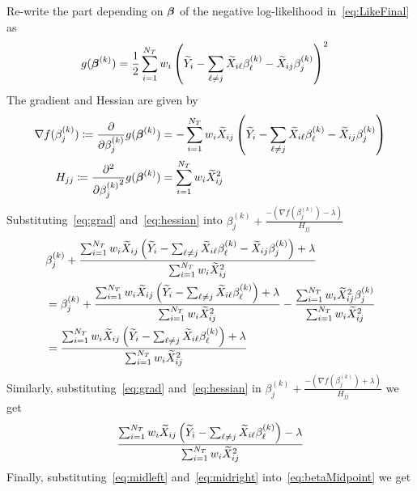 Re-write the part depending on $\boldsymbol{\beta}$ of the negative log-likelihood in~\eqref{eq:LikeFinal} as
\begin{align}
g(\boldsymbol{\beta}^{(k)}) & = \frac{1}{2} \sum_{i=1}^{N_T} w_i\left(  \widetilde{Y}_i - \sum_{\ell \neq j}\widetilde{X}_{i\ell} \beta_\ell^{(k)} - \widetilde{X}_{ij}\beta_j^{(k)} \right) ^2
\end{align}
The gradient and Hessian are given by
\begin{align}
\nabla f(\beta_j^{(k)}) \coloneqq \frac{\partial}{\partial \beta_j^{(k)}}g(\boldsymbol{\beta}^{(k)}) & = - \sum_{i=1}^{N_T} w_i \widetilde{X}_{ij}\left(  \widetilde{Y}_i - \sum_{\ell \neq j}\widetilde{X}_{i\ell} \beta_\ell^{(k)} - \widetilde{X}_{ij}\beta_j^{(k)} \right)  \label{eq:grad}\\
H_{jj} \coloneqq \frac{\partial^2}{\partial {\beta_j^{(k)}}^2}g(\boldsymbol{\beta}^{(k)}) & = \sum_{i=1}^{N_T} w_i \widetilde{X}_{ij}^2  \label{eq:hessian}
\end{align}
Substituting~\eqref{eq:grad} and~\eqref{eq:hessian} into $\beta_j^{(k)}+ \frac{-(\nabla f(\beta_j^{(k)}) - \lambda)}{H_{jj}}$ %
\begin{align}
& \beta_j^{(k)}+ \frac{  \sum_{i=1}^{N_T} w_i \widetilde{X}_{ij}\left(  \widetilde{Y}_i - \sum_{\ell \neq j}\widetilde{X}_{i\ell} \beta_\ell^{(k)} - \widetilde{X}_{ij}\beta_j^{(k)} \right)  + \lambda }{\sum_{i=1}^{N_T} w_i \widetilde{X}_{ij}^2} \nonumber \\
& = \beta_j^{(k)}+ \frac{ \sum_{i=1}^{N_T} w_i \widetilde{X}_{ij}\left(  \widetilde{Y}_i - \sum_{\ell \neq j}\widetilde{X}_{i\ell} \beta_\ell^{(k)} \right) + \lambda}{\sum_{i=1}^{N_T} w_i \widetilde{X}_{ij}^2} - \frac{\sum_{i=1}^{N_T} w_i \widetilde{X}_{ij}^2\beta_j^{(k)}  }{\sum_{i=1}^{N_T} w_i \widetilde{X}_{ij}^2} \nonumber \\
& =  \frac{  \sum_{i=1}^{N_T} w_i \widetilde{X}_{ij}\left(  \widetilde{Y}_i - \sum_{\ell \neq j}\widetilde{X}_{i\ell} \beta_\ell^{(k)} \right) + \lambda}{\sum_{i=1}^{N_T} w_i \widetilde{X}_{ij}^2} \label{eq:midleft}
\end{align}
Similarly, substituting~\eqref{eq:grad} and~\eqref{eq:hessian} in $\beta_j^{(k)}+ \frac{-(\nabla f(\beta_j^{(k)}) + \lambda)}{H_{jj}}$ we get
\begin{align}
\frac{  \sum_{i=1}^{N_T} w_i \widetilde{X}_{ij}\left(  \widetilde{Y}_i - \sum_{\ell \neq j}\widetilde{X}_{i\ell} \beta_\ell^{(k)} \right) - \lambda}{\sum_{i=1}^{N_T} w_i \widetilde{X}_{ij}^2} \label{eq:midright}
\end{align}
Finally, substituting~\eqref{eq:midleft} and~\eqref{eq:midright} into~\eqref{eq:betaMidpoint} we get
